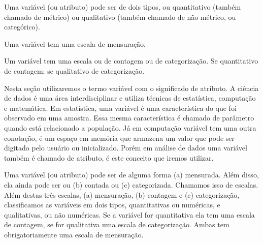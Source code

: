 \documentclass[a4paper,12pt]{book}
\begin{document}
\begin{tcolorbox}[title=Tipos de variável]
Uma variável (ou atributo) pode ser de dois tipos, ou quantitativo (também chamado de métrico) ou qualitativo (também chamado de não métrico, ou categórico).
\end{tcolorbox}

\begin{tcolorbox}[title=Escalas da variável (Mensuração)]
Uma variável tem uma escala de mensuração.
\end{tcolorbox}

\begin{tcolorbox}[title=Escalas da variável (contagem ou categorização)]
Um variável tem uma escala ou de contagem ou de categorização. Se quantitativo de contagem; se qualitativo de categorização.
\end{tcolorbox}


Nesta seção utilizaremos o termo variável com o significado de atributo. A ciência de dados é uma área interdisciplinar e utiliza técnicas de estatística, computação e matemática. Em estatística, uma variável é uma característica do que foi observado em uma amostra. Essa mesma característica é chamado de parâmetro quando está relacionado a população. Já em computação variável tem uma outra conotação, é um espaço em memória que armazena um valor que pode ser digitado pelo usuário ou inicializado. Porém em análise de dados uma variável também é chamado de atributo, é este conceito que iremos utilizar.


Uma variável (ou atributo) pode ser de alguma forma (a) mensurada. Além disso, ela ainda pode ser ou (b) contada ou (c) categorizada. Chamamos isso de escalas. Além destas três escalas, (a) mensuração, (b) contagem e (c) categorização, classificamos as variáveis em dois tipos, quantitativas ou numéricas, e qualitativas, ou não numéricas. Se a variável for quantitativa ela tem uma escala de contagem, se for qualitativa uma escala de categorização. Ambas tem obrigatoriamente uma escala de mensuração.

\end{document}
